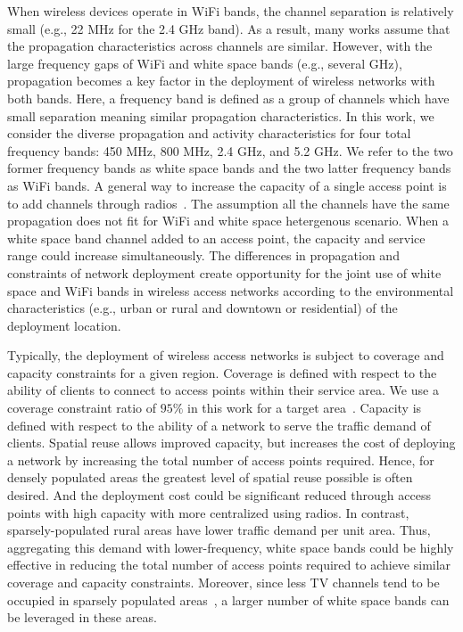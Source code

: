 When wireless devices operate in WiFi bands, the channel separation is relatively
small (e.g., 22 MHz for the 2.4 GHz band). As a result, many works assume that
the propagation characteristics across channels are similar. However, with the
large frequency gaps of WiFi and white space bands (e.g., several GHz),
propagation becomes a key factor in the deployment of wireless networks with both bands.
Here, a frequency band is defined as a group of channels which have
small separation meaning similar propagation characteristics.
In this work, we consider the diverse propagation and activity characteristics
for four total frequency bands: 450 MHz, 800 MHz, 2.4 GHz, and 5.2 GHz.
We refer to the two former frequency bands as white space bands and
the two latter frequency bands as WiFi bands.
A general way to increase the capacity of a single access point is to add channels
through radios~\cite{raniwala2005architecture}. The assumption all the channels have
the same propagation does not fit for WiFi and white space hetergenous scenario.
When a white space band channel added to an access point, the capacity and service 
range could increase simultaneously. The differences in propagation and constraints 
of network deployment create opportunity for the joint use of white space and 
WiFi bands in wireless access networks according to the environmental characteristics 
(e.g., urban or rural and downtown or residential) of the deployment location.

Typically, the deployment of wireless access networks is subject to coverage and capacity
constraints for a given region. Coverage is defined with respect to the ability of
clients to connect to access points within their service area.  We use a coverage
constraint ratio of $95\%$ in this work for a target area~\cite{robinson2010deploying}.
Capacity is defined with respect to the ability of a network to serve the traffic 
demand of clients.  Spatial reuse allows improved capacity, but increases the cost
of deploying a network by increasing the total number of access points required.
Hence, for densely populated areas the greatest level of spatial reuse possible
is often desired. And the deployment cost could be significant reduced through access 
points with high capacity with more centralized using radios. In contrast, 
sparsely-populated rural areas have lower traffic demand per unit area. Thus, 
aggregating this demand with lower-frequency, white space bands could be highly 
effective in reducing the total number of access points required to achieve 
similar coverage and capacity constraints. Moreover, since less TV channels tend
 to be occupied in sparsely populated areas~\cite{msdatabase}, a larger number 
 of white space bands can be leveraged in these areas. 




